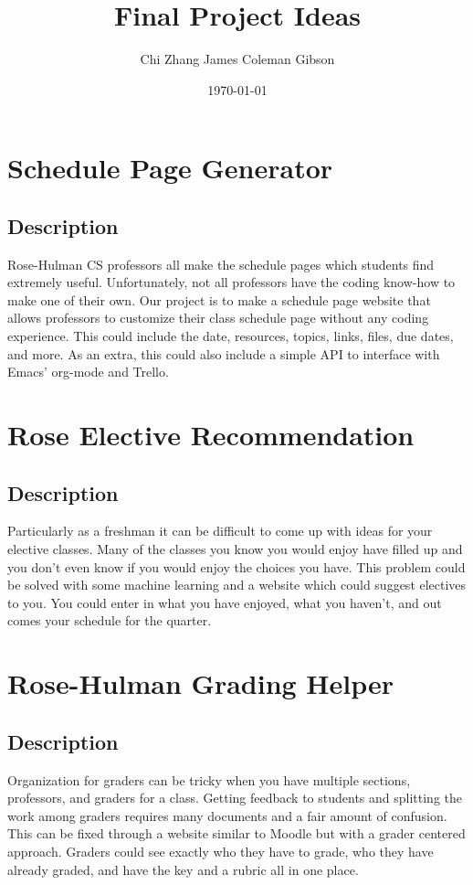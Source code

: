 \documentclass{article}
\title{\Huge Final Project Ideas}
\author{\large Chi Zhang James Coleman Gibson}
\date{\small \today}
\begin{document}
\maketitle

\section{Schedule Page Generator}
\subsection*{Description}
Rose-Hulman CS professors all make the schedule pages which students find
extremely useful. Unfortunately, not all professors have the coding know-how
to make one of their own. Our project is to make a schedule page website that
allows professors to customize their class schedule page without any coding
experience. This could include the date, resources, topics, links, files, due
dates, and more. As an extra, this could also include a simple API to interface
with Emacs' org-mode and Trello.

\section{Rose Elective Recommendation}
\subsection*{Description}
Particularly as a freshman it can be difficult to come up with ideas for your
elective classes. Many of the classes you know you would enjoy have filled up
and you don't even know if you would enjoy the choices you have. This problem
could be solved with some machine learning and a website which could suggest
electives to you. You could enter in what you have enjoyed, what you haven't,
and out comes your schedule for the quarter.

\section{Rose-Hulman Grading Helper}
\subsection*{Description}
Organization for graders can be tricky when you have multiple sections,
professors, and graders for a class. Getting feedback to students and splitting
the work among graders requires many documents and a fair amount of confusion.
This can be fixed through a website similar to Moodle but with a grader
centered approach. Graders could see exactly who they have to grade, who they
have already graded, and have the key and a rubric all in one place.
\end{document}
